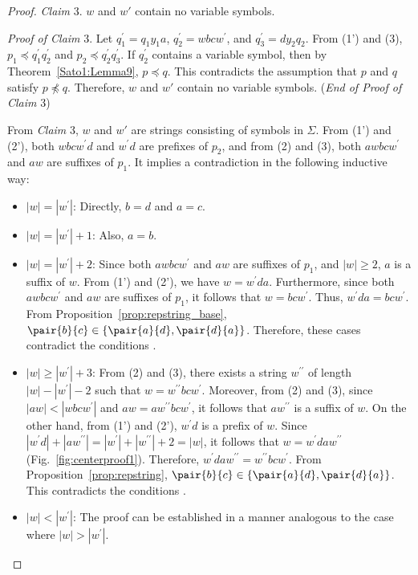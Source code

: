 \begin{proof}
  \smallskip

  \noindent
  \textit{Claim} 3. $w$ and $w'$ contain no variable symbols.

  \smallskip
  \noindent
  \textit{Proof of Claim} 3.
  Let $q_{1}^{\prime} = q_{1}y_{1}a$, $q_{2}^{\prime} = wbcw^{\prime}$, and $q_{3}^{\prime} = dy_{2}q_{2}$.
  From (1') and (3), $p_{1} \preceq q^{\prime}_{1}q^{\prime}_{2}$ and $p_{2} \preceq q^{\prime}_{2}q^{\prime}_{3}$.
  If $q_{2}^{\prime}$ contains a variable symbol, then by Theorem~\ref{Sato1:Lemma9}, $p \preceq q$.
  {\color{black}This contradicts the assumption that $p$ and $q$ satisfy 
  $p\not\preceq q$.}
  Therefore, $w$ and $w'$ contain no variable symbols.
  (\textit{End of Proof of Claim} 3)

  \smallskip

  From \textit{Claim} 3, $w$ and $w'$ are strings consisting of symbols in $\Sigma$.
  From (1') and (2'), {\color{black}both }$wbcw^{\prime}d$ and $w^{\prime}d$ are prefixes of $p_{2}$, and from (2) and (3), {\color{black}both }$awbcw^{\prime}$ and $aw$ are suffixes of $p_{1}$.
  It implies a contradiction in the following inductive way:
  
  \begin{itemize}
  \item $|w|=|w^{\prime}|$: Directly, $b = d$ and $a = c$.
  \item $|w|=|w^{\prime}|+1$: Also, $a = b$.
  \item $|w| = |w^{\prime}|+2$: Since {\color{black}both }$awbcw^{\prime}$ and $aw$ are suffixes of $p_{1}$, and $|w|\geq 2$, $a$ is a suffix of $w$.
  From (1') and (2'), we have $w=w^{\prime}da$.
  Furthermore, since {\color{black}both }$awbcw^{\prime}$ and $aw$ are suffixes of $p_{1}$, it follows that $w=bcw^{\prime}$.
  Thus, $w^{\prime}da = bcw^{\prime}$.
  From Proposition~\ref{prop:repstring_base}, $\pair{b}{c} \in \{\pair{a}{d}, \pair{d}{a}\}$.
  Therefore, these cases contradict the conditions \TheConditionA.
  \item $|w| \ge |w^{\prime}|+3$: From (2) and (3), there exists a string $w^{\prime\prime}$ of length $|w|-|w^{\prime}|-2$ such that $w=w^{\prime\prime}bcw^{\prime}$.
  Moreover, from (2) and (3), since $|aw| < |wbcw^{\prime}|$ and $aw = aw^{\prime\prime}bcw^{\prime}$, it follows that $aw^{\prime\prime}$ is a suffix of $w$.
  On the other hand, from (1') and (2'), $w^{\prime}d$ is a prefix of $w$.
  Since $|w^{\prime}d| + |aw^{\prime\prime}| = |w^{\prime}| + |w^{\prime\prime}| + 2 = |w|$, it follows that $w=w^{\prime}daw^{\prime\prime}$ (Fig.~\ref{fig:centerproof1}).
  Therefore, $w^{\prime}daw^{\prime\prime} = w^{\prime\prime}bcw^{\prime}$.
  From Proposition~\ref{prop:repstring}, $\pair{b}{c} \in \{\pair{a}{d}, \pair{d}{a}\}$.
  This contradicts the conditions \TheConditionA.
  \item {\color{black}$|w| < |w^{\prime}|$: The proof can be established in a manner analogous to the case where $|w|>|w^{\prime}|$.}
\end{itemize}


\end{proof}
